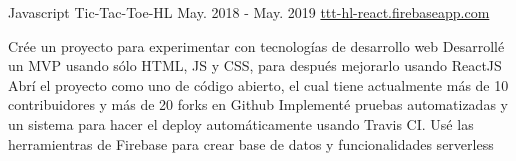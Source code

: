 \begin{cventries}

  \cventry
    {Javascript}
    {Tic-Tac-Toe-HL} %
    {May. 2018 - May. 2019} %
    {\url{ttt-hl-react.firebaseapp.com}} %
    {
      \begin{cvitems} %
         {{
          Crée un proyecto para experimentar con tecnologías de desarrollo web
        }}
         {{
          Desarrollé un MVP usando sólo HTML, JS y CSS, para después mejorarlo usando ReactJS
        }}
         {{
          Abrí el proyecto como uno de código abierto, el cual tiene actualmente más de 10 contribuidores y más de 20 forks en Github
        }}
         {{
          Implementé pruebas automatizadas y un sistema para hacer el deploy automáticamente usando Travis CI.
        }}
         {{
          Usé las herramientras de Firebase para crear base de datos y funcionalidades serverless
        }}
      \end{cvitems}
    }


\end{cventries}
